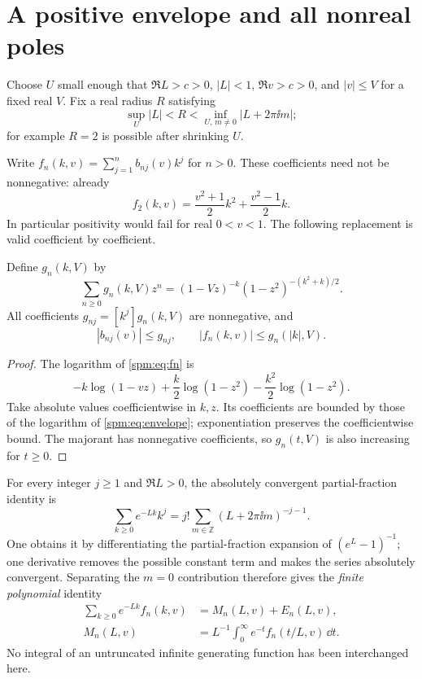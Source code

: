 \section{A positive envelope and all nonreal poles}\label{spm:sec:envelope}
Choose $U$ small enough that $\Re L>c>0$, $|L|<1$, $\Re v>c>0$, and $|v|\leq V$ for a fixed real $V$. Fix a real radius $R$ satisfying
\begin{equation}\label{spm:eq:R}
 \sup_U|L|<R<\inf_{U,\,m\ne0}|L+2\pi\ii m|;
\end{equation}
for example $R=2$ is possible after shrinking $U$.

Write $f_n(k,v)=\sum_{j=1}^n b_{nj}(v)k^j$ for $n>0$. These coefficients need not be nonnegative: already
\[
 f_2(k,v)=\frac{v^2+1}{2}k^2+\frac{v^2-1}{2}k.
\]
In particular positivity would fail for real $0<v<1$. The following replacement is valid coefficient by coefficient.

\begin{lemma}\label{spm:lem:envelope}
Define $g_n(k,V)$ by
\begin{equation}\label{spm:eq:envelope}
 \sum_{n\geq0}g_n(k,V)z^n
 =(1-Vz)^{-k}(1-z^2)^{-(k^2+k)/2}.
\end{equation}
All coefficients $g_{nj}=[k^j]g_n(k,V)$ are nonnegative, and
\[
 |b_{nj}(v)|\leq g_{nj},\qquad
 |f_n(k,v)|\leq g_n(|k|,V).
\]
\end{lemma}
\begin{proof}
The logarithm of \eqref{spm:eq:fn} is
\[
 -k\log(1-vz)+\frac{k}{2}\log(1-z^2)
 -\frac{k^2}{2}\log(1-z^2).
\]
Take absolute values coefficientwise in $k,z$. Its coefficients are bounded by those of the logarithm of \eqref{spm:eq:envelope}; exponentiation preserves the coefficientwise bound. The majorant has nonnegative coefficients, so $g_n(t,V)$ is also increasing for $t\geq0$.
\end{proof}

For every integer $j\geq1$ and $\Re L>0$, the absolutely convergent partial-fraction identity is
\begin{equation}\label{spm:eq:poles}
 \sum_{k\geq0}e^{-Lk}k^j
 =j!\sum_{m\in\mathbb Z}(L+2\pi\ii m)^{-j-1}.
\end{equation}
One obtains it by differentiating the partial-fraction expansion of $(e^L-1)^{-1}$; one derivative removes the possible constant term and makes the series absolutely convergent. Separating the $m=0$ contribution therefore gives the \emph{finite polynomial} identity
\begin{align}
 \sum_{k\geq0}e^{-Lk}f_n(k,v)&=M_n(L,v)+E_n(L,v),\label{spm:eq:mainpluserror}\\
 M_n(L,v)&=L^{-1}\int_0^\infty e^{-t}f_n(t/L,v)\,\dd t.
 \label{spm:eq:gammaexact}
\end{align}
No integral of an untruncated infinite generating function has been interchanged here.

